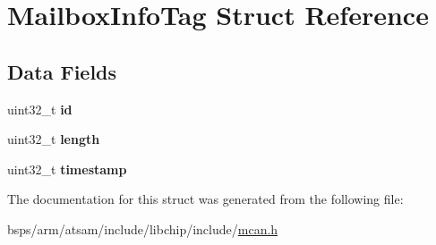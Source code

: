 \hypertarget{structMailboxInfoTag}{}\section{Mailbox\+Info\+Tag Struct Reference}
\label{structMailboxInfoTag}
\subsection*{Data Fields}
\begin{DoxyCompactItemize}
\item 
\mbox{\label{structMailboxInfoTag_a49f3bcb39e3f0733787e473dbb382ac1}} 
uint32\+\_\+t {\bfseries id}
\item 
\mbox{\label{structMailboxInfoTag_a2982be7fd2e0f8f926208942bba3750e}} 
uint32\+\_\+t {\bfseries length}
\item 
\mbox{\label{structMailboxInfoTag_a0a032bff37374b5fcc8e0beb46307e9b}} 
uint32\+\_\+t {\bfseries timestamp}
\end{DoxyCompactItemize}


The documentation for this struct was generated from the following file\+:\begin{DoxyCompactItemize}
\item 
bsps/arm/atsam/include/libchip/include/\mbox{\hyperlink{mcan_8h}{mcan.\+h}}\end{DoxyCompactItemize}
